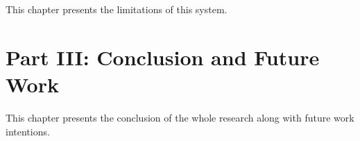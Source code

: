   \vspace{1mm}

\noindent  This chapter presents the limitations of this system.

\section*{Part III: Conclusion and Future Work}

  \vspace{1mm}

\noindent  This chapter presents the conclusion of the whole research along with future work intentions.